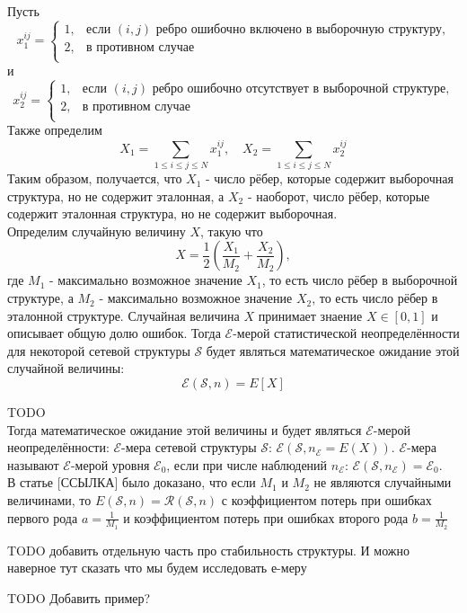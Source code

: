Пусть 
\begin{equation*}
  x_{1}^{i j} =
    \begin{cases}
      1, & \text{если $(i,j)$ ребро ошибочно включено в выборочную структуру,}\\
      2, & \text{в противном случае}\\
    \end{cases}       
\end{equation*}
и
\begin{equation*}
  x_{2}^{i j} =
    \begin{cases}
      1, & \text{если $(i,j)$ ребро ошибочно отсутствует в выборочной структуре,}\\
      2, & \text{в противном случае}\\
    \end{cases}       
\end{equation*}
Также определим
\[
X_1=\sum_{1\leq i \leq j \leq N}{x_{1}^{i j}}, \quad  X_2=\sum_{1\leq i \leq j \leq N}{x_{2}^{i j}}
\]
Таким образом, получается, что $X_1$ - число рёбер, которые содержит выборочная структура, но не содержит эталонная, а $X_2$ - наоборот, число рёбер, которые содержит эталонная структура, но не содержит выборочная.\\
Определим случайную величину $X$, такую что
\begin{equation}
X = \frac{1}{2}\left( \frac{X_1}{M_2}+\frac{X_2}{M_2} \right),
\end{equation}
где $M_1$ - максимально возможное значение $X_1$, то есть число рёбер в выборочной структуре, а $M_2$ - максимально возможное значение $X_2$, то есть число рёбер в эталонной структуре. Случайная величина $X$ принимает знаение $X \in [0,1]$ и описывает общую долю ошибок. 
Тогда $\mathcal{E}$-мерой статистической неопределённости для некоторой сетевой структуры $\mathcal{S}$ будет являться математическое ожидание этой случайной величины: 
\begin{equation}
\mathcal{E}(\mathcal{S},n) = E[X]
\end{equation}





TODO\\ 
Тогда математическое ожидание этой величины и будет являться  $\mathcal{E}$-мерой неопределённости: $\mathcal{E}$-мера сетевой структуры $\mathcal{S}$: $\mathcal{E}(\mathcal{S},n_\mathcal{E} = E(X))$. $\mathcal{E}$-мера называют $\mathcal{E}$-мерой уровня $\mathcal{E}_0$, если при числе наблюдений $n_\mathcal{E}$: $\mathcal{E}(\mathcal{S},n_\mathcal{E}) = \mathcal{E}_0$.\\


В статье  [ССЫЛКА] было доказано, что если $M_1$ и $M_2$ не являются случайными величинами, то  $E(\mathcal{S}, n) = \mathcal{R}(\mathcal{S}, n)$ с коэффициентом потерь при ошибках первого рода $a = \frac{1}{M_1}$ и коэффициентом потерь при ошибках второго рода $b = \frac{1}{M_2}$

TODO добавить отдельную часть про стабильность структуры. И можно наверное тут сказать что мы будем исследовать е-меру

TODO Добавить пример?


